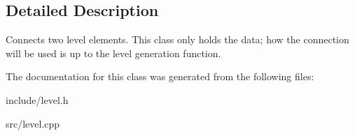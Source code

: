 \subsection{\-Detailed \-Description}
\-Connects two level elements. \-This class only holds the data; how the connection will be used is up to the level generation function. 

\-The documentation for this class was generated from the following files\-:\begin{DoxyCompactItemize}
\item 
include/level.\-h\item 
src/level.\-cpp\end{DoxyCompactItemize}
